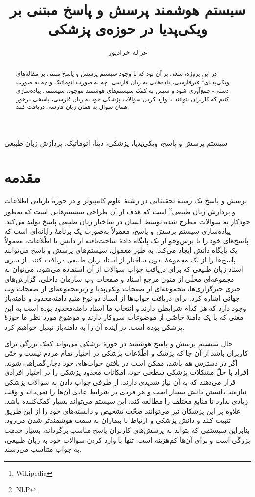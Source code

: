 \documentclass{CCI2020}
\title{
سیستم هوشمند پرسش و پاسخ مبتنی بر ویکی‌پدیا در حوزه‌ی پزشکی
}
\date{}
\author{غزاله خرادپور}
\affil{
 دانشجوی کارشناسی رشتهٔ علوم کامپیوتر، دانشکدهٔ علوم کامپیوتر دانشگاه صنعتی امیرکبیر، تهران، ایران
}
\affil{
استاد راهنما: دکتر اکبری
}
\begin{document}
\maketitle
\thispagestyle{firstpage}
\begin{abstract}
در این پروژه، سعی بر آن بود که با وجود سیستم پرسش و پاسخ مبتنی بر مقاله‌های ویکی‌پدیای\footnote{Wikipedia} غیرفارسی، داده‌هایی به زبان فارسی -چه به صورت اتوماتیک و چه به صورت دستی- جمع‌آوری شود و سپس به کمک سیستم‌های هوشمند موجود، سیستمی پیاده‌سازی کنیم که کاربران بتوانند با وارد کردن سؤالات پزشکی خود به زبان فارسی، پاسخی درخور همان سوال به همان زبان فارسی دریافت کنند.
 \end{abstract}
\begin{keywords}
سیستم پرسش و پاسخ، ویکی‌پدیا، پزشکی، دیتا، اتوماتیک، پردازش زبان طبیعی
\end{keywords}


\section{مقدمه}
پرسش و پاسخ یک زمینهٔ تحقیقاتی در رشتهٔ علوم کامپیوتر و در حوزهٔ بازیابی اطلاعات و پردازش زبان طبیعی\footnote{NLP} است که هدف از آن طراحی سیستم‌هایی است که به‌طور خودکار به سوالات مطرح شده توسط انسان در ساختار زبان طبیعی پاسخ تولید می‌کند. پیاده‌سازی سیستم پرسش و پاسخ، معمولاً به‌صورت یک برنامهٔ رایانه‌ای است که پاسخ‌های خود را با پرس‌و‌جو از یک پایگاه دادهٔ ساخت‌یافته از دانش یا اطّلاعات، معمولاً یک پایگاه دانش ایجاد می‌کند. به طور معمول، سیستم‌های پرسش و پاسخ می‌توانند پاسخ‌ها را از یک مجموعهٔ بدون ساختار از اسناد زبان طبیعی دریافت کنند.
از سری اسناد زبان طبیعی که برای دریافت جواب سؤالات از آن استفاده می‌شود، می‌توان به مجموعه‌ای محلّی از متون مرجع
اسناد و صفحات وب سازمان داخلی،
گزارش‌های خبری خبرگزاری‌ها،
مجموعه‌ای از صفحات ویکی‌پدیا و 
زیرمجموعه‌ای از صفحات وب جهانی اشاره کرد.
برای دریافت جواب‌ها از اسناد دو نوع منبع دامنه‌محدود و دامنه‌باز وجود دارد که هر کدام شرایطی دارند و انتخاب ما اسناد دامنه‌محدود بوده است به این معنی که با یک دامنهٔ خاصّی از موضوعات سروکار دارند و موضوع مورد نظر ما حوزهٔ پزشکی بوده است. در آینده آن را به دامنه‌باز تبدیل خواهیم کرد.



حال سیستم پرسش و پاسخ هوشمند در حوزهٔ پزشکی می‌تواند کمک بزرگی برای کاربران باشد از آن جا که پزشک و اطّلاعات پزشکی در اختیار تمام مردم نیست و حتّی اگر در دسترس هم باشد، ممکن است در یافتن جواب‌های خود دچار گمراهی شوند. افراد با حلّ مشکلات پزشکی سطحی خود، امکانات محدود پزشکی را در اختیار افرادی قرار می‌دهند که به آن نیاز شدیدی دارند.
از طرفی جواب دادن به سؤالات پزشکی نیازمند دانستن دانش بسیار است و هر فردی در شرایط عادی آن‌ها را نمی‌داند و وقت زیادی ندارد تا منابع مختلف را مطالعه کند، این سیستم می‌تواند بسیار کمک‌کننده باشد. علاوه بر این پزشکان نیز می‌توانند صحّت تشخیص و دانسته‌های خود را از این طریق تثبیت کنند و دانش پزشکی و ارتباط با بیماران به سمت هوشمندتر شدن می‌رود.
بنابراین سیستمی که بتواند به پرسش‌های کاربران پاسخ مناسب برگرداند، بسیار خدمت بزرگی است و برای آن‌ها کم‌هزینه است. تنها با وارد کردن سوالات خود به زبان طبیعی، به جواب متناسب می‌رسند.
\end{document}
